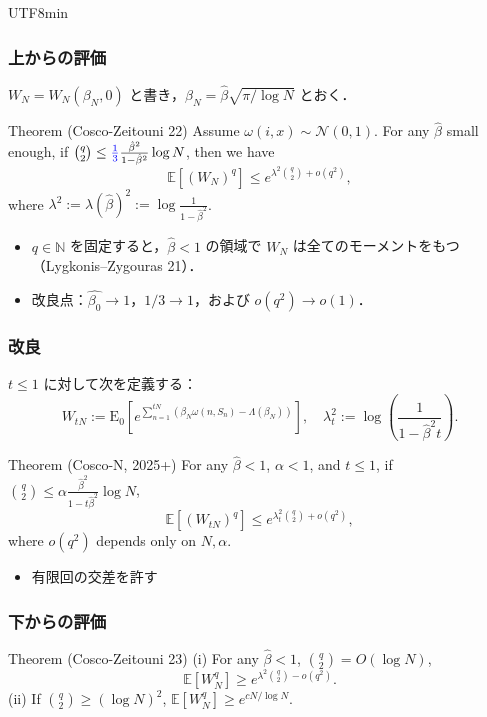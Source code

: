 \documentclass{beamer}
\newcommand{\DE}{{\mathrm E}}
\newcommand{\IE}{\mathbb E}
\begin{document}
\begin{CJK*}{UTF8}{min}
\begin{frame}
\frametitle{上からの評価}
$W_N = W_N(\beta_N,0)$ と書き，$\beta_N =\hat{\beta}\sqrt{\pi/\log N}$ とおく．
\begin{block}{Theorem (Cosco-Zeitouni 22)}
Assume $\omega(i,x) \sim \mathcal N(0,1)$. For any $\hat \beta$ small enough, if $\binom q 2\leq \textcolor{blue}{\frac{1}{3}}\frac{\hat \beta^2}{1-\hat \beta^2}\log N$, then we have 
\[\IE\left[(W_N)^q\right] \leq e^{\lambda^2 \binom{q}{2} + o(q^2)},
\]
where $\lambda^2:=\lambda(\hat \beta)^2 := \log \frac{1}{1-\hat{\beta}^2}$.
\end{block}
\begin{itemize}
\item<2-> $q\in \mathbb N$ を固定すると，$\hat \beta < 1$ の領域で $W_N$ は全てのモーメントをもつ（Lygkonis--Zygouras 21）．
\item<3-> 改良点：$\hat{\beta_0} \to 1$，$1/3\to 1$，および $o(q^2) \to o(1)$．
\end{itemize}
\end{frame}






\begin{frame}
  \frametitle{改良}
$t\leq 1$ に対して次を定義する：
  $$
  W_{tN}:=\DE_0\left[e^{\sum_{n=1}^{tN} \left(\beta_N \omega(n,S_n) -\Lambda(\beta_N)\right)}\right],\quad \lambda_{t}^2 := \log \left(\frac{1}{1-\hat{\beta}^2 t }\right).$$

  \begin{block}{Theorem (Cosco-N, 2025+)}
For any $\hat \beta < 1$, $\alpha< 1$, and $t\leq 1$, if  $ \binom q 2\leq \alpha \frac{\hat \beta^2}{1-t \hat \beta^2} \log N$, 
  \[\IE\left[(W_{tN})^q\right] \leq e^{\lambda_{t}^2 \binom{q}{2} + o(q^2)},
  \]
  where $o(q^2)$ depends only on $N,\alpha$.
  \end{block}
  \begin{itemize}
      \item 有限回の交差を許す
  \end{itemize}
\end{frame}




\begin{frame}
  \frametitle{下からの評価}
  \begin{block}{Theorem (Cosco-Zeitouni 23)}
    (i) For any $\hat{\beta} <1$, $\binom q 2=O(\log N)$, 
    \[\IE\left[W_N^q\right] \geq e^{\lambda^2 \binom{q}{2} - o(q^2)}.
    \]
    (ii) If $\binom q 2 \geq (\log N)^2$, $\IE[W_N^q] \geq e^{cN/\log N}$.
    \end{block}
\end{frame}


\end{CJK*}
\end{document}

